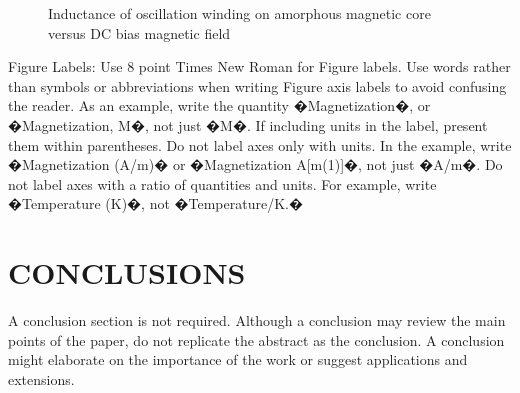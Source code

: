 \documentclass[letterpaper, 10 pt, conference]{ieeeconf}  %
\begin{document}
   \begin{figure}[thpb]
      \centering
      \caption{Inductance of oscillation winding on amorphous
       magnetic core versus DC bias magnetic field}
      \label{figurelabel}
   \end{figure}
   

Figure Labels: Use 8 point Times New Roman for Figure labels. Use words rather than symbols or abbreviations when writing Figure axis labels to avoid confusing the reader. As an example, write the quantity �Magnetization�, or �Magnetization, M�, not just �M�. If including units in the label, present them within parentheses. Do not label axes only with units. In the example, write �Magnetization (A/m)� or �Magnetization {A[m(1)]}�, not just �A/m�. Do not label axes with a ratio of quantities and units. For example, write �Temperature (K)�, not �Temperature/K.�

\section{CONCLUSIONS}

A conclusion section is not required. Although a conclusion may review the main points of the paper, do not replicate the abstract as the conclusion. A conclusion might elaborate on the importance of the work or suggest applications and extensions. 

\addtolength{\textheight}{-12cm}   %




\end{document}
